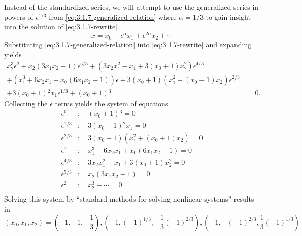 \documentclass[12pt,twoside]{article}
\begin{document}
Instead of the standardized series, we will attempt to use the generalized
series in powers of $\epsilon^{1/3}$ from \cref{eq:3.1.7-generalized-relation}
where $\alpha=1/3$ to gain insight into the solution of \cref{eq:3.1.7-rewrite}.
\begin{equation}
  \label{eq:3.1.7-generalized-relation}
  x=x_0+\epsilon^{\alpha} x_1 + \epsilon^{2\alpha}x_2+\cdots
\end{equation}
Substituting \cref{eq:3.1.7-generalized-relation} into \cref{eq:3.1.7-rewrite}
and expanding yields
\begin{equation*}
  \begin{split}
    x_2^3 \epsilon ^2
    +x_2 \left(3 x_1 x_2-1\right) \epsilon ^{5/3}
    +\left(3 x_2 x_1^2-x_1+3 \left(x_0+1\right) x_2^2\right) \epsilon^{4/3} \\
    +\left(x_1^3+6 x_2 x_1+x_0\left(6 x_1 x_2-1\right)\right) \epsilon
    +3\left(x_0+1\right) \left(x_1^2+\left(x_0+1\right) x_2\right) \epsilon^{2/3} \\
    +3\left(x_0+1\right){}^2 x_1 \epsilon^{1/3}
    +\left(x_0+1\right){}^3&=0.
  \end{split}
\end{equation*}
Collecting the $\epsilon$ terms yields the system of equations
\begin{equation*}
  \begin{aligned}
    \epsilon^0 &:\quad \left(x_0+1\right){}^3=0 \\
    \epsilon^{1/3} &:\quad 3 \left(x_0+1\right){}^2 x_1=0 \\
    \epsilon^{2/3} &:\quad 3 \left(x_0+1\right) \left(x_1^2+\left(x_0+1\right) x_2\right)=0 \\
    \epsilon^{1} &:\quad x_1^3+6 x_2 x_1+x_0 \left(6 x_1 x_2-1\right)=0 \\
    \epsilon^{4/3} &:\quad 3 x_2 x_1^2-x_1+3 \left(x_0+1\right) x_2^2=0 \\
    \epsilon^{5/3} &:\quad x_2 \left(3 x_1 x_2-1\right)=0 \\
    \epsilon^{2} &:\quad x_2^3+\cdots=0 \\
  \end{aligned}
\end{equation*}
Solving this system by ``standard methods for solving nonlinear systems''
results in
\begin{equation*}
  (x_0,x_1,x_2) = {\left(-1, -1, -\frac{1}{3}\right),
    \left( -1,{(-1)}^{1/3},-\frac{1}{3}{(-1)}^{2/3} \right),
    \left( -1,-{(-1)}^{2/3},\frac{1}{3}{(-1)}^{1/3} \right)}
\end{equation*}
\end{document}
